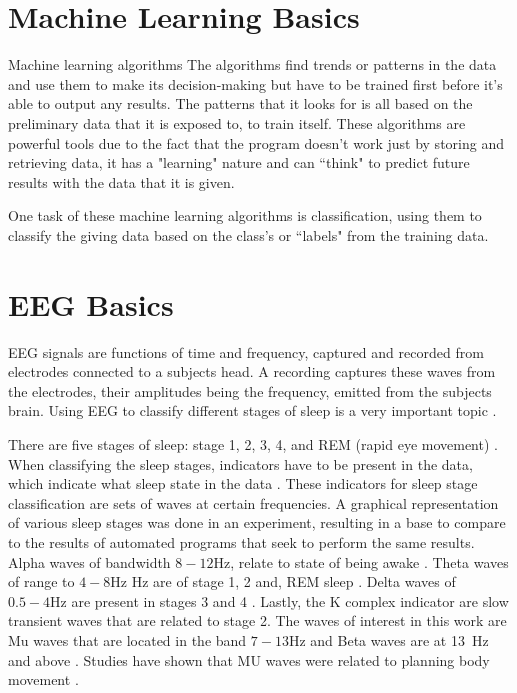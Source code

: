 \documentclass[conference,compsoc]{IEEEtran}
\begin{document}
\section{Machine Learning Basics}
Machine learning algorithms 
The algorithms find trends or patterns in the data and use them to make its decision-making but have to be trained first before it's able to output any results. 
The patterns that it looks for is all based on the preliminary data that it is exposed to, to train itself. These algorithms are powerful tools due to the fact that 
the program doesn't work just by storing and retrieving data, it has a "learning" nature and can ``think" to predict future results with the data that it is given.

One task of these machine learning algorithms is classification, using them to classify the giving data based on the class's or ``labels" from the training data. 

\section{EEG Basics}
EEG signals are functions of time and frequency, captured and recorded from electrodes connected to a subjects head. A recording captures these waves from the electrodes, their amplitudes being the frequency, emitted from the subjects brain.  
Using EEG to classify different stages of sleep is a very important topic \cite{auto}.

There are five stages of sleep:  stage 1, 2, 3, 4, and REM (rapid eye movement) \cite{sleep}. When classifying the sleep stages, indicators 
have to be present in the data, which indicate what sleep state in the data \cite{auto}. These indicators for sleep stage classification are sets of waves at certain frequencies. A graphical representation of various sleep stages was done in an experiment, resulting in a base to compare to the results of automated programs that seek to perform the same results. Alpha waves of bandwidth $8-12\si{\hertz}$, relate to state of being awake \cite{auto}. Theta waves of range to $4-8\si{\hertz}$ Hz are of stage 1, 2 and, REM sleep \cite{auto}.  Delta waves of $0.5-4\si{\hertz}$ are present in stages 3 and 4 \cite{auto}. Lastly, the K complex indicator are slow transient waves that are related to stage 2.  The waves of interest in this work are Mu waves that are located in the band $7 - 13\si{\hertz}$ and Beta waves are at \SI{13}{\hertz} and above \cite{classsvm}. Studies have shown that MU waves were related to planning body movement \cite{classsvm}.
\end{document}
